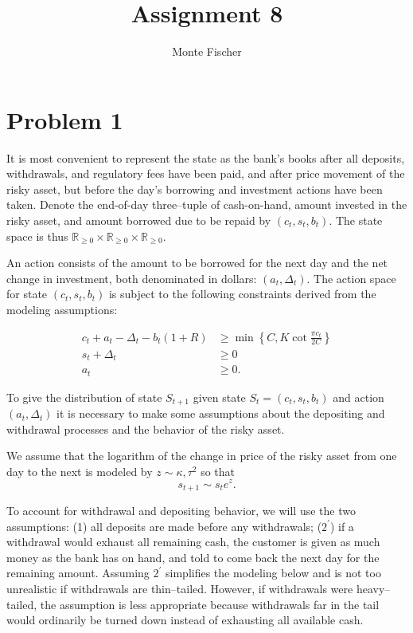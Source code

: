 \documentclass{article}
\title{Assignment 8}
\author{Monte Fischer}
\begin{document}
\maketitle

\section*{Problem 1}

It is most convenient to represent the state as the bank's books after all deposits, withdrawals, and regulatory fees have been paid, and after price movement of the risky asset, but before the day's borrowing and investment actions have been taken. Denote the end-of-day three--tuple of cash-on-hand, amount invested in the risky asset, and amount borrowed due to be repaid by $(c_t, s_t, b_t)$. The state space is thus $\mathbb{R}_{\geq 0}\times\mathbb{R}_{\geq 0}\times \mathbb{R}_{\geq 0}$.

An action consists of the amount to be borrowed for the next day and the net change in investment, both denominated in dollars: $(a_t, \Delta_t)$. The action space for state $(c_t, s_t, b_t)$ is subject to the following constraints derived from the modeling assumptions:

\begin{align}
    c_t + a_t - \Delta_t - b_t(1+R) &\geq \min \left\{C, K \cot \frac{\pi c_t}{2C} \right\} \\
    s_t + \Delta_t &\geq 0\\
    a_t &\geq 0.
\end{align}

To give the distribution of state $S_{t+1}$ given state $S_t=(c_t, s_t, b_t)$ and action $(a_t, \Delta_t)$ it is necessary to make some assumptions about the depositing and withdrawal processes and the behavior of the risky asset.

We assume that the logarithm of the change in price of the risky asset from one day to the next is modeled by $z \sim \mathcal{\kappa, \tau^2}$ so that
\begin{equation}
    s_{t+1} \sim s_t e^{z}.
\end{equation}

To account for withdrawal and depositing behavior, we will use the two assumptions: (1) all deposits are made before any withdrawals; ($2^\prime$) if a withdrawal would exhaust all remaining cash, the customer is given as much money as the bank has on hand, and told to come back the next day for the remaining amount. Assuming $2^\prime$ simplifies the modeling below and is not too unrealistic if withdrawals are thin--tailed. However, if withdrawals were heavy--tailed, the assumption is less appropriate because withdrawals far in the tail would ordinarily be turned down instead of exhausting all available cash.
\end{document}
